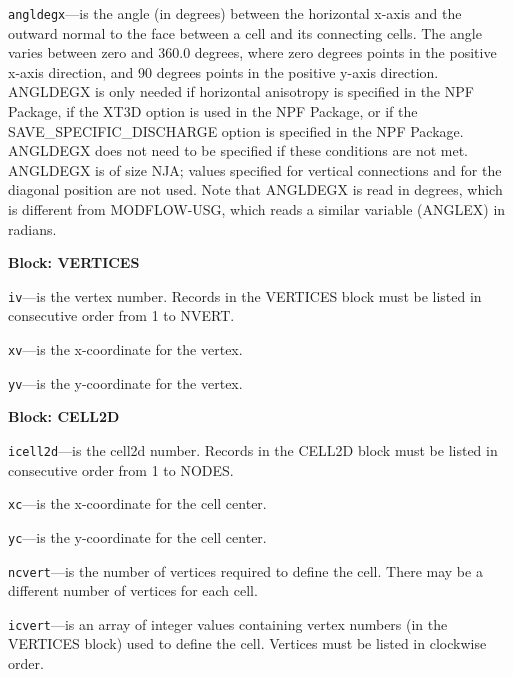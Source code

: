 \begin{description}
\item \texttt{angldegx}---is the angle (in degrees) between the horizontal x-axis and the outward normal to the face between a cell and its connecting cells. The angle varies between zero and 360.0 degrees, where zero degrees points in the positive x-axis direction, and 90 degrees points in the positive y-axis direction.  ANGLDEGX is only needed if horizontal anisotropy is specified in the NPF Package, if the XT3D option is used in the NPF Package, or if the SAVE\_SPECIFIC\_DISCHARGE option is specified in the NPF Package.  ANGLDEGX does not need to be specified if these conditions are not met.  ANGLDEGX is of size NJA; values specified for vertical connections and for the diagonal position are not used.  Note that ANGLDEGX is read in degrees, which is different from MODFLOW-USG, which reads a similar variable (ANGLEX) in radians.

\end{description}
\item \textbf{Block: VERTICES}

\begin{description}
\item \texttt{iv}---is the vertex number.  Records in the VERTICES block must be listed in consecutive order from 1 to NVERT.

\item \texttt{xv}---is the x-coordinate for the vertex.

\item \texttt{yv}---is the y-coordinate for the vertex.

\end{description}
\item \textbf{Block: CELL2D}

\begin{description}
\item \texttt{icell2d}---is the cell2d number.  Records in the CELL2D block must be listed in consecutive order from 1 to NODES.

\item \texttt{xc}---is the x-coordinate for the cell center.

\item \texttt{yc}---is the y-coordinate for the cell center.

\item \texttt{ncvert}---is the number of vertices required to define the cell.  There may be a different number of vertices for each cell.

\item \texttt{icvert}---is an array of integer values containing vertex numbers (in the VERTICES block) used to define the cell.  Vertices must be listed in clockwise order.

\end{description}

